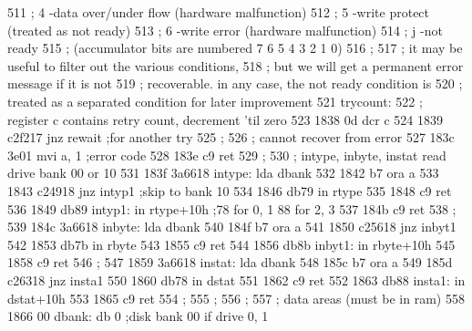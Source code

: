 511                       ;        4        -data over/under flow (hardware malfunction)
512                       ;        5        -write protect (treated as not ready)
513                       ;        6        -write error (hardware malfunction)
514                       ;        j        -not ready
515                       ;        (accumulator bits are numbered 7 6 5 4 3 2 1 0)
516                       ;
517                       ;        it may be useful to filter out the various conditions,
518                       ;        but we will get a permanent error message if it is not
519                       ;        recoverable.  in any case, the not ready condition is
520                       ;        treated as a separated condition for later improvement
521                       trycount:
522                       ;        register c contains retry count, decrement 'til zero
523      1838 0d                   dcr      c
524      1839 c2f217               jnz      rewait     ;for another try
525                       ;
526                       ;        cannot recover from error
527      183c 3e01                 mvi      a, 1       ;error code
528      183e c9                   ret
529                       ;
530                       ;        intype, inbyte, instat read drive bank 00 or 10
531      183f 3a6618      intype:  lda      dbank
532      1842 b7                   ora      a
533      1843 c24918               jnz      intyp1     ;skip to bank 10
534      1846 db79                 in       rtype
535      1848 c9                   ret
536      1849 db89        intyp1:  in       rtype+10h        ;78 for 0, 1 88 for 2, 3
537      184b c9                   ret
538                       ;
539      184c 3a6618      inbyte:  lda      dbank
540      184f b7                   ora      a
541      1850 c25618               jnz      inbyt1
542      1853 db7b                 in       rbyte
543      1855 c9                   ret
544      1856 db8b        inbyt1:  in       rbyte+10h
545      1858 c9                   ret
546                       ;
547      1859 3a6618      instat:  lda      dbank
548      185c b7                   ora      a
549      185d c26318               jnz      insta1
550      1860 db78                 in       dstat
551      1862 c9                   ret
552      1863 db88        insta1:  in       dstat+10h
553      1865 c9                   ret
554                       ;
555                       ;
556                       ;
557                       ;        data areas (must be in ram)
558      1866 00          dbank:   db       0          ;disk bank 00 if drive 0, 1
